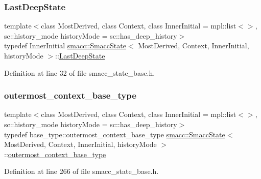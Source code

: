 \subsubsection{\texorpdfstring{Last\+Deep\+State}{LastDeepState}}
{\footnotesize\ttfamily template$<$class Most\+Derived, class Context, class Inner\+Initial = mpl\+::list$<$$>$, sc\+::history\+\_\+mode history\+Mode = sc\+::has\+\_\+deep\+\_\+history$>$ \\
typedef Inner\+Initial \hyperlink{classsmacc_1_1SmaccState}{smacc\+::\+Smacc\+State}$<$ Most\+Derived, Context, Inner\+Initial, history\+Mode $>$\+::\hyperlink{classsmacc_1_1SmaccState_a60088405d2d99d468caa0baa3b2830a8}{Last\+Deep\+State}}



Definition at line 32 of file smacc\+\_\+state\+\_\+base.\+h.

\mbox{\label{classsmacc_1_1SmaccState_aaf76bbe2aa9dd73e3284605f84ab4b16}} 
\subsubsection{\texorpdfstring{outermost\+\_\+context\+\_\+base\+\_\+type}{outermost\_context\_base\_type}}
{\footnotesize\ttfamily template$<$class Most\+Derived, class Context, class Inner\+Initial = mpl\+::list$<$$>$, sc\+::history\+\_\+mode history\+Mode = sc\+::has\+\_\+deep\+\_\+history$>$ \\
typedef base\+\_\+type\+::outermost\+\_\+context\+\_\+base\+\_\+type \hyperlink{classsmacc_1_1SmaccState}{smacc\+::\+Smacc\+State}$<$ Most\+Derived, Context, Inner\+Initial, history\+Mode $>$\+::\hyperlink{classsmacc_1_1SmaccState_aaf76bbe2aa9dd73e3284605f84ab4b16}{outermost\+\_\+context\+\_\+base\+\_\+type}}



Definition at line 266 of file smacc\+\_\+state\+\_\+base.\+h.

\mbox{\label{classsmacc_1_1SmaccState_a12497b38e710f07cacb5d45efc024339}} 
